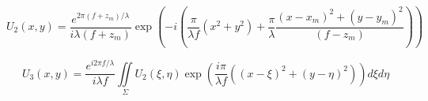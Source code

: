 \documentclass{kepfl}
\begin{document}
\begin{equation}
{U_2}(x,y) = \frac{{{e^{2\pi (f + {z_m})/\lambda }}}}{{i\lambda (f + {z_m})}}\exp \left( { - i\left( {\frac{\pi }{{\lambda f}}({x^2} + {y^2}) + \frac{\pi }{\lambda }\frac{{{{(x - {x_m})}^2} + {{(y - {y_m})}^2}}}{{(f - {z_m})}}} \right)} \right)
\end{equation}

\begin{equation}
{U_3}(x,y) = \frac{{{e^{i2\pi f/\lambda }}}}{{i\lambda f}}\iint\limits_\Sigma  {{U_2}(\xi ,\eta )\exp \left( {\frac{{i\pi }}{{\lambda f}}\left( {{{(x - \xi )}^2} + {{(y - \eta )}^2}} \right)} \right)d\xi d\eta }
\end{equation}
\end{document}
